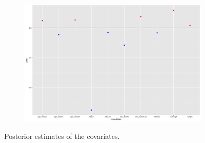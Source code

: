 \documentclass[11pt]{article}
\begin{document}
\begin{figure}

    \begin{subfigure}[t]{0.9\textwidth}
        \centering
        \includegraphics[width=\linewidth]{Ex5/figures/2post covariates0.png} 
    \end{subfigure}
    \caption{Posterior estimates of the covariates.}
\end{figure}
\end{document}
